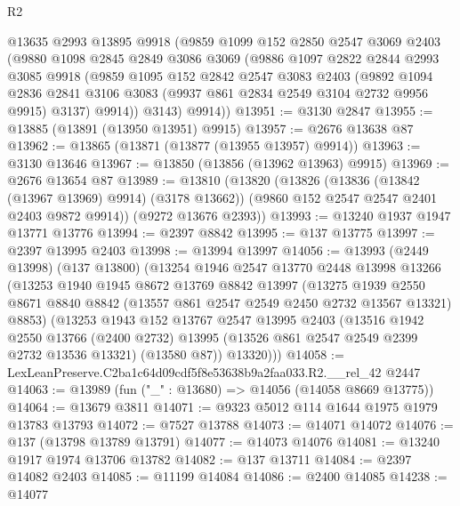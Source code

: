 \begin{lexlean}{R2}
\begin{coremodule}
      @13635
      @2993
      @13895
      @9918
      (@9859
        @1099
        @152
        @2850
        @2547
        @3069
        @2403
        (@9880
          @1098
          @2845
          @2849
          @3086
          @3069
          (@9886
            @1097
            @2822
            @2844
            @2993
            @3085
            @9918
            (@9859
              @1095
              @152
              @2842
              @2547
              @3083
              @2403
              (@9892
                @1094
                @2836
                @2841
                @3106
                @3083
                (@9937 @861 @2834 @2549 @3104 @2732 @9956 @9915)
                @3137)
              @9914))
          @3143)
        @9914))
@13951 := @3130 @2847
@13955 := @13885 (@13891 (@13950 @13951) @9915)
@13957 := @2676 @13638 @87
@13962 := @13865 (@13871 (@13877 (@13955 @13957) @9914))
@13963 := @3130 @13646
@13967 := @13850 (@13856 (@13962 @13963) @9915)
@13969 := @2676 @13654 @87
@13989 := @13810
    (@13820
      (@13826
        (@13836 (@13842 (@13967 @13969) @9914) (@3178 @13662))
        (@9860 @152 @2547 @2547 @2401 @2403 @9872 @9914))
      (@9272 @13676 @2393))
@13993 := @13240 @1937 @1947 @13771 @13776
@13994 := @2397 @8842
@13995 := @137 @13775
@13997 := @2397 @13995 @2403
@13998 := @13994 @13997
@14056 := @13993
    (@2449 @13998)
    (@137 @13800)
    (@13254
      @1946
      @2547
      @13770
      @2448
      @13998
      @13266
      (@13253
        @1940
        @1945
        @8672
        @13769
        @8842
        @13997
        (@13275
          @1939
          @2550
          @8671
          @8840
          @8842
          (@13557 @861 @2547 @2549 @2450 @2732 @13567 @13321)
          @8853)
        (@13253
          @1943
          @152
          @13767
          @2547
          @13995
          @2403
          (@13516
            @1942
            @2550
            @13766
            (@2400 @2732)
            @13995
            (@13526 @861 @2547 @2549 @2399 @2732 @13536 @13321)
            (@13580 @87))
          @13320)))
@14058 := LexLeanPreserve.C2ba1c64d09cdf5f8e53638b9a2faa033.R2.__rel_42 @2447
@14063 := @13989 (fun ("_" : @13680) => @14056 (@14058 @8669 @13775))
@14064 := @13679 @3811
@14071 := @9323 @5012 @114 @1644 @1975 @1979 @13783 @13793
@14072 := @7527 @13788
@14073 := @14071 @14072
@14076 := @137 (@13798 @13789 @13791)
@14077 := @14073 @14076
@14081 := @13240 @1917 @1974 @13706 @13782
@14082 := @137 @13711
@14084 := @2397 @14082 @2403
@14085 := @11199 @14084
@14086 := @2400 @14085
@14238 := @14077

\end{coremodule}
\end{lexlean}
